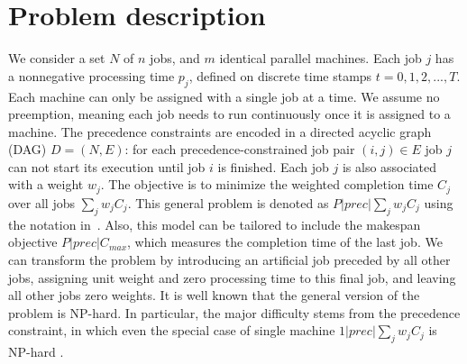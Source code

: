 \section{Problem description} \label{s:problem}
We consider a set $N$ of $n$ jobs, and $m$ identical parallel machines. Each job
$j$ has a nonnegative processing time $p_j$, defined on discrete time stamps $t = 0, 1, 2,
..., T$. Each machine can only be assigned with a single job at a time. We assume no
preemption, meaning each job needs to run continuously once it is assigned to a
machine. The precedence constraints are encoded in a directed acyclic graph
(DAG) $D=(N,E)$: for each precedence-constrained job pair $(i,j) \in E$ job $j$
can not start its execution until job $i$ is finished. Each job $j$ is also associated with a
weight $w_j$. The objective is to minimize the weighted completion time $C_j$
over all jobs $\sum_j w_j C_j$. This general problem is denoted as  $P|prec|\sum_j w_jC_j$
using the notation in~\cite{graham1979optimization}. Also, this model can be tailored to include the makespan objective $P|prec|C_{max}$, which measures the completion time of the last job. We can transform the problem by introducing an artificial job preceded by all other jobs, assigning unit weight and zero processing time to this final job, and leaving all other jobs zero weights. It is well known that the general version of the problem is NP-hard. In particular, the major difficulty stems from the precedence constraint, in which even the special case of single machine $1|prec|\sum_j w_jC_j$ is NP-hard \cite{lenstra1978complexity}.
